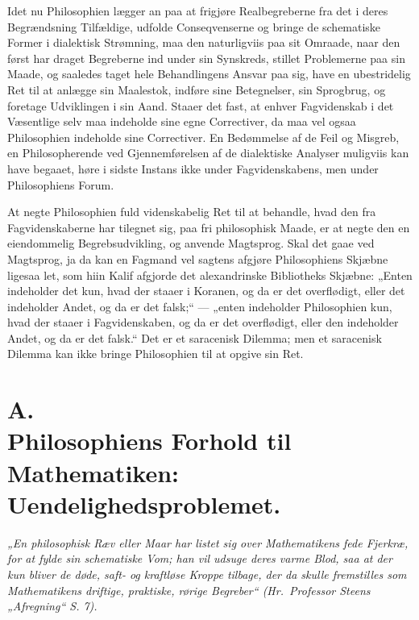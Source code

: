 \documentclass[12pt,a4paper]{book}
\begin{document}
Idet nu Philosophien lægger an paa at frigjøre Realbegreberne fra det
i deres Begrændsning Tilfældige, udfolde Conseqvenserne og bringe de
schematiske Former i dialektisk Strømning, maa den
naturligviis paa sit Omraade, naar den først har draget Begreberne ind
under sin Synskreds, stillet Problemerne paa sin Maade, og saaledes
taget hele Behandlingens Ansvar paa sig, have en ubestridelig Ret til
at anlægge sin Maalestok, indføre sine Betegnelser, sin Sprogbrug, og
foretage Udviklingen i sin Aand. Staaer det fast, at enhver
Fagvidenskab i det Væsentlige selv maa indeholde sine egne
Correctiver, da maa vel ogsaa Philosophien indeholde sine
Correctiver. En Bedømmelse af de Feil og Misgreb, en Philosopherende
ved Gjennemførelsen af de dialektiske Analyser muligviis kan have
begaaet, høre i sidste Instans ikke under Fagvidenskabens, men under
Philosophiens Forum.

At negte Philosophien fuld videnskabelig Ret til at behandle, hvad den
fra Fagvidenskaberne har tilegnet sig, paa fri philosophisk Maade, er
at negte den en eiendommelig Begrebsudvikling, og anvende Magtsprog.
Skal det gaae ved Magtsprog, ja da kan en Fagmand vel sagtens afgjøre
Philosophiens Skjæbne ligesaa let, som hiin Kalif afgjorde det
alexandrinske Bibliotheks Skjæbne: „Enten indeholder det kun, hvad der
staaer i Koranen, og da er det overflødigt,
eller det indeholder Andet, og da er det falsk;“ --- „enten indeholder
Philosophien kun, hvad der staaer i Fagvidenskaben, og da er det
overflødigt, eller den indeholder Andet, og da er det falsk.“ Det er
et saracenisk Dilemma; men et saracenisk Dilemma kan ikke bringe
Philosophien til at opgive sin Ret.

\section*{A.\\ Philosophiens Forhold til Mathematiken:\\
Uendelighedsproblemet.}

\emph{„En philosophisk Ræv eller Maar har listet sig over
Mathematikens fede Fjerkræ, for at fylde sin schematiske Vom; han vil
udsuge deres varme Blod, saa at der kun bliver de døde, saft- og
kraftløse Kroppe tilbage, der da skulle fremstilles som Mathematikens
driftige, praktiske, rørige Begreber“ (Hr.~Professor Steens
„Afregning“ S. 7).}
\end{document}
